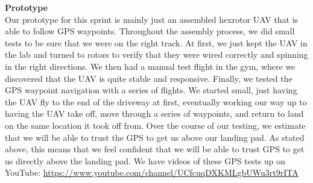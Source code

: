 \vspace{6mm}
\noindent\Large{\textbf{Prototype}}\\
\normalsize
Our prototype for this sprint is mainly just an assembled hexrotor UAV that is able to follow GPS waypoints. Throughout the assembly process, we did small tests to be sure that we were on the right track. At first, we just kept the UAV in the lab and turned to rotors to verify that they were wired correctly and spinning in the right directions. We then had a manual test flight in the gym, where we discovered that the UAV is quite stable and responsive. Finally, we tested the GPS waypoint navigation with a series of flights. We started small, just having the UAV fly to the end of the driveway at first, eventually working our way up to having the UAV take off, move through a series of waypoints, and return to land on the same location it took off from. Over the course of our testing, we estimate that we will be able to trust the GPS to get us above our landing pad. As stated above, this means that we feel confident that we will be able to trust GPS to get us directly above the landing pad. \newline\newline
We have videos of these GPS tests up on YouTube: \url{https://www.youtube.com/channel/UCfcuqDXKMLgbUWu3rt9rITA}
